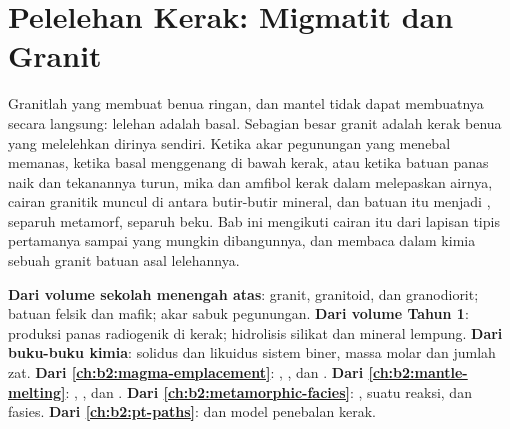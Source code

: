 \chapter{Pelelehan Kerak: Migmatit dan Granit}\label{ch:b2:crustal-melting}

Granitlah yang membuat benua ringan, dan mantel tidak dapat membuatnya secara langsung:
lelehan  adalah basal. Sebagian besar granit adalah kerak benua yang melelehkan dirinya sendiri.
Ketika akar pegunungan yang menebal memanas, ketika basal menggenang di bawah kerak, atau ketika batuan
panas naik dan tekanannya turun, mika dan amfibol kerak dalam melepaskan
airnya, cairan granitik muncul di antara butir-butir mineral, dan batuan itu menjadi
, separuh metamorf, separuh beku. Bab ini mengikuti cairan itu dari lapisan tipis
pertamanya sampai  yang mungkin dibangunnya, dan membaca dalam kimia sebuah granit batuan asal
lelehannya.

\begin{recall}
\textbf{Dari volume sekolah menengah atas}: granit, granitoid, dan granodiorit; batuan felsik dan mafik;
akar sabuk pegunungan. \textbf{Dari volume Tahun 1}: produksi panas radiogenik
di kerak; hidrolisis silikat dan mineral lempung. \textbf{Dari buku-buku kimia}: solidus dan likuidus
sistem biner, massa molar dan jumlah zat. \textbf{Dari
\cref{ch:b2:magma-emplacement}}: , , dan . \textbf{Dari
\cref{ch:b2:mantle-melting}}: , , dan . \textbf{Dari \cref{ch:b2:metamorphic-facies}}: , 
suatu reaksi, dan fasies. \textbf{Dari \cref{ch:b2:pt-paths}}:  dan
model penebalan kerak.
\end{recall}

